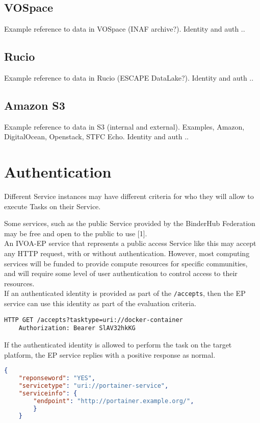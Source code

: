 \documentclass[11pt,a4paper]{ivoa}
\newcommand{\ivoep} {IVOA-EP\xspace}
\newcommand{\codeword}[1] {\texttt{#1}}
\begin{document}
\subsection{VOSpace}
\label{sec:data-access-vospace}

Example reference to data in VOSpace (INAF archive?).
Identity and auth ..

\subsection{Rucio}
\label{sec:data-access-rucio}

Example reference to data in Rucio (ESCAPE DataLake?).
Identity and auth ..

\subsection{Amazon S3}
\label{sec:data-access-amazons3}

Example reference to data in S3 (internal and external).
Examples, Amazon, DigitalOcean, Openstack, STFC Echo.
Identity and auth ..


\section{Authentication}
\label{sec:authentication}
Different Service instances may have different criteria for who they will allow to execute Tasks on their Service.

Some services, such as the public Service provided by the BinderHub Federation may be free and open to the public to use [1].
\\
An \ivoep service that represents a public access Service like this may accept any HTTP request, with or without authentication.
However, most computing services will be funded to provide compute resources for specific communities, and will require some level of user authentication to control access to their resources.
\\
If an authenticated identity is provided as part of the \codeword{/accepts}, then the EP service can use this identity as part of the evaluation criteria.
\begin{lstlisting}[]
    HTTP GET /accepts?tasktype=uri://docker-container
    Authorization: Bearer SlAV32hkKG
\end{lstlisting}

If the authenticated identity is allowed to perform the task on the target platform, the EP service replies with a positive
response as normal.
\begin{lstlisting}[language=json]
    {
    "reponseword": "YES",
    "servicetype": "uri://portainer-service",
    "serviceinfo": {
        "endpoint": "http://portainer.example.org/",
        }
    }
\end{lstlisting}
\end{document}
